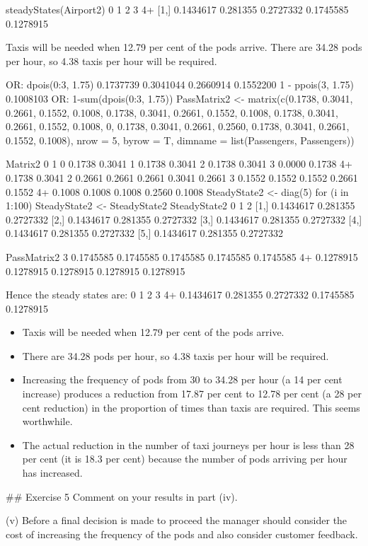 \documentclass[a4paper,12pt]{article}
\begin{document}
steadyStates(Airport2)
0
1
2
3
4+
[1,] 0.1434617 0.281355 0.2727332 0.1745585 0.1278915


Taxis will be needed when 12.79 per cent of the pods arrive.
There are 34.28 pods per hour, so 4.38 taxis per hour will be required.

OR:
dpois(0:3, 1.75)
 0.1737739 0.3041044 0.2660914 0.1552200
1 - ppois(3, 1.75)
 0.1008103
OR:
1-sum(dpois(0:3, 1.75))
PassMatrix2 <- matrix(c(0.1738, 0.3041, 0.2661, 0.1552,
0.1008, 0.1738, 0.3041, 0.2661, 0.1552, 0.1008, 0.1738,
0.3041, 0.2661, 0.1552, 0.1008, 0, 0.1738, 0.3041,
0.2661, 0.2560, 0.1738, 0.3041, 0.2661, 0.1552, 0.1008),
nrow = 5, byrow = T, dimname = list(Passengers,
Passengers))

\newpage 


Matrix2
0
1
0 0.1738 0.3041
1 0.1738 0.3041
2 0.1738 0.3041
3 0.0000 0.1738
4+ 0.1738 0.3041
2
0.2661
0.2661
0.2661
0.3041
0.2661
3
0.1552
0.1552
0.1552
0.2661
0.1552
4+
0.1008
0.1008
0.1008
0.2560
0.1008
SteadyState2 <- diag(5)
for (i in 1:100){
SteadyState2 <- SteadyState2 %
}
SteadyState2
0
1
2
[1,] 0.1434617 0.281355 0.2727332
[2,] 0.1434617 0.281355 0.2727332
[3,] 0.1434617 0.281355 0.2727332
[4,] 0.1434617 0.281355 0.2727332
[5,] 0.1434617 0.281355 0.2727332

PassMatrix2
3
0.1745585
0.1745585
0.1745585
0.1745585
0.1745585
4+
0.1278915
0.1278915
0.1278915
0.1278915
0.1278915

Hence the steady states are:
0
1
2
3
4+
0.1434617 0.281355 0.2727332 0.1745585 0.1278915




\begin{itemize}
    \item Taxis will be needed when 12.79 per cent of the pods arrive.
    \item There are 34.28 pods per hour, so 4.38 taxis per hour will be required. 
    \item Increasing the frequency of pods from 30 to 34.28 per hour (a 14 per cent
increase) produces a reduction from 17.87 per cent to 12.78 per cent (a 28
per cent reduction) in the proportion of times than taxis are required. 
This seems worthwhile. 
    \item The actual reduction in the number of taxi journeys per hour is less than
28 per cent (it is 18.3 per cent) because the number of pods arriving per hour
has increased. 
\end{itemize}









\newpage 
## Exercise 5
Comment on your results in part (iv).


(v)
Before a final decision is made to proceed the manager should consider the cost of
increasing the frequency of the pods and also consider customer feedback.
\end{document}
